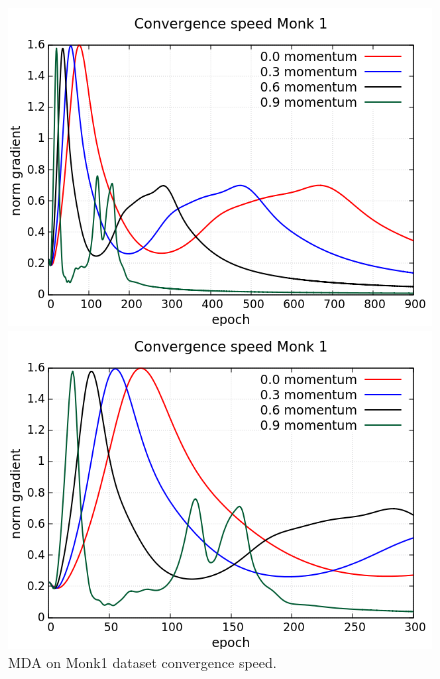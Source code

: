 \begin{figure}[H]
	\centering
	\begin{minipage}[t]{0.5\linewidth}
		\includegraphics[width=\linewidth]{data/MGD/Monk1/M/Monk1_MGD_CS_standard.png}
	\end{minipage}%
	\begin{minipage}[t]{0.5\linewidth}
		\includegraphics[width=\linewidth]{data/MGD/Monk1/M/Monk1_MGD_CS_zoom.png}
	\end{minipage}
	\caption{MDA on Monk1 dataset convergence speed.}
\end{figure}
